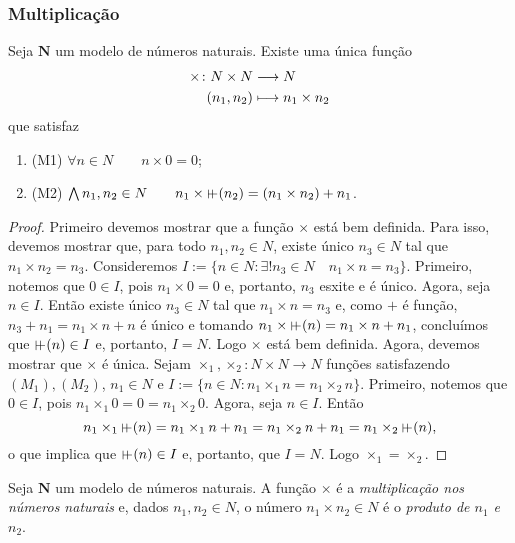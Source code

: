 \subsubsection{Multiplicação}

\begin{theorem}
	Seja $\bm N$ um modelo de números naturais. Existe uma única função
	\begin{align*}
	{\times}\colon {N \times N} &\longrightarrow {N} \\{(n_1,n_2)} &\longmapsto n_1 \times n_2
	\end{align*}
que satisfaz
	\begin{enumerate}
	\item (M1) $\forall n \in N \qquad n \times 0 = 0$;
	\item (M2) $\forall n_1,n_2 \in N \qquad n_1 \times \suce(n_2) = (n_1 \times n_2) + n_1$.
	\end{enumerate}
\end{theorem}
\begin{proof}
	Primeiro devemos mostrar que a função $\times$ está bem definida. Para isso, devemos mostrar que, para todo $n_1,n_2 \in N$, existe único $n_3 \in N$ tal que $n_1 \times n_2=n_3$. Consideremos $I := \{n \in N : \exists! n_3 \in N \quad n_1 \times n = n_3\}$. Primeiro, notemos que $0 \in I$, pois $n_1 \times 0 = 0$ e, portanto, $n_3$ esxite e é único. Agora, seja $n \in I$. Então existe único $n_3 \in N$ tal que $n_1 \times n = n_3$ e, como $+$ é função, $n_3 + n_1=n_1 \times n + n$ é único e tomando $n_1 \times \suce(n)=n_1 \times n + n_1$, concluímos que $\suce(n) \in I$ e, portanto, $I=N$. Logo $\times$ está bem definida. Agora, devemos mostrar que $\times$ é única. Sejam $\times_1,\times_2: N \times N \to N$ funções satisfazendo $(M_1),(M_2)$, $n_1 \in N$ e $I := \{n \in N : n_1 \times_1 n = n_1 \times_2 n\}$. Primeiro, notemos que $0 \in I$, pois $n_1 \times_1 0 = 0 = n_1 \times_2 0$. Agora, seja $n \in I$. Então
	\begin{equation*}
	n_1 \times_1 \suce(n) = n_1 \times_1 n + n_1 = n_1 \times_2 n + n_1 = n_1 \times_2 \suce(n),
	\end{equation*}
o que implica que $\suce(n) \in I$ e, portanto, que $I=N$. Logo $\times_1=\times_2$.
\end{proof}

\begin{definition}
	Seja $\bm N$ um modelo de números naturais. A função $\times$ é a \emph{multiplicação nos números naturais} e, dados $n_1,n_2 \in N$, o número $n_1 \times n_2 \in N$ é o \emph{produto de $n_1$ e $n_2$}.
\end{definition}

